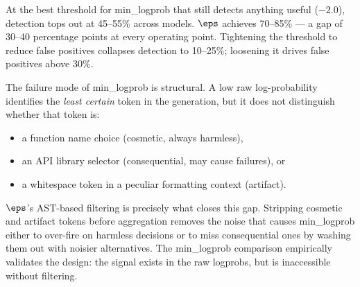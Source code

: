 At the best threshold for min\_logprob that still detects anything
useful ($-2.0$), detection tops out at 45--55\% across models. $\eps$
achieves 70--85\% --- a gap of 30--40 percentage points at every
operating point. Tightening the threshold to reduce false positives
collapses detection to 10--25\%; loosening it drives false positives
above 30\%.

The failure mode of min\_logprob is structural. A low raw log-probability
identifies the \emph{least certain} token in the generation, but it does
not distinguish whether that token is:
\begin{itemize}[noitemsep]
  \item a function name choice (cosmetic, always harmless),
  \item an API library selector (consequential, may cause failures), or
  \item a whitespace token in a peculiar formatting context (artifact).
\end{itemize}

$\eps$'s AST-based filtering is precisely what closes this gap. Stripping
cosmetic and artifact tokens before aggregation removes the noise that
causes min\_logprob either to over-fire on harmless decisions or to miss
consequential ones by washing them out with noisier alternatives. The
min\_logprob comparison empirically validates the design: the signal
exists in the raw logprobs, but is inaccessible without filtering.
